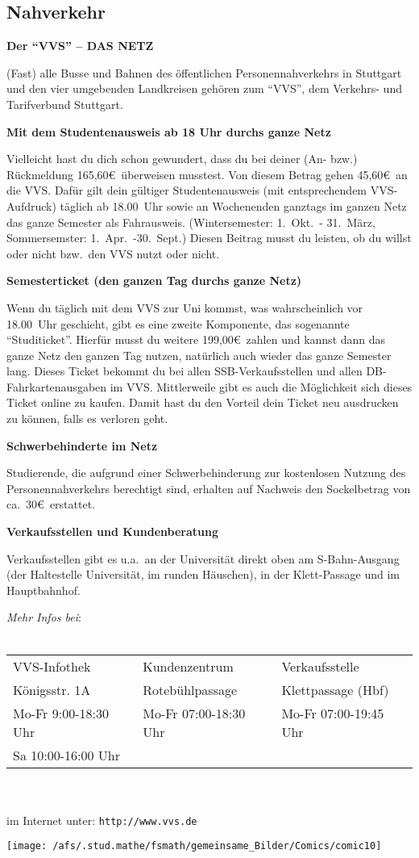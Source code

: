 \subsection{Nahverkehr}

{\large \bf Der "`VVS"' -- DAS NETZ}

(Fast) alle Busse und Bahnen des öffentlichen Personennahverkehrs
in Stuttgart und den vier umgebenden Landkreisen
gehören zum "`VVS"', dem Verkehrs- und Tarifverbund Stuttgart.

{\large \bf Mit dem Studentenausweis ab 18 Uhr durchs ganze Netz}

Vielleicht hast du dich schon gewundert,
dass du bei deiner (An- bzw.) Rückmeldung 165,60\euro\ überweisen musstest.
Von diesem Betrag gehen 45,60\euro\ an die VVS.
Dafür gilt dein gültiger Studentenausweis
(mit entsprechendem VVS-Aufdruck) täglich ab 18.00~Uhr
sowie an Wochenenden ganztags im ganzen Netz
das ganze Semester als Fahrausweis.
(Wintersemester: 1.~Okt.~- 31.~März, Sommersemster: 1.~Apr.~-30.~Sept.)
Diesen Beitrag musst du leisten,
ob du willst oder nicht bzw.~den VVS nutzt oder nicht.

{\large \bf Semesterticket (den ganzen Tag durchs ganze Netz)}

Wenn du täglich mit dem VVS zur Uni kommst,
was wahrscheinlich vor 18.00~Uhr geschieht,
gibt es eine zweite Komponente, das sogenannte "`Studiticket"'.
Hierfür musst du weitere 199,00\euro\ zahlen
und kannst dann das ganze Netz den ganzen Tag nutzen,
natürlich auch wieder das ganze Semester lang.
Dieses Ticket bekommt du bei allen SSB-Verkaufsstellen
und allen DB-Fahrkartenausgaben im VVS.
Mittlerweile gibt es auch die Möglichkeit sich dieses Ticket
online zu kaufen.
Damit hast du den Vorteil dein Ticket neu ausdrucken zu können,
falls es verloren geht.

{\large \bf Schwerbehinderte im Netz}

Studierende, die aufgrund einer Schwerbehinderung
zur kostenlosen Nutzung des Personennahverkehrs berechtigt sind,
erhalten auf Nachweis den Sockelbetrag von ca.\ 30\euro\ erstattet.

{\large \bf Verkaufsstellen und Kundenberatung}

Verkaufsstellen gibt es u.a.\ 
an der Universität direkt oben am S-Bahn-Ausgang
(der Haltestelle \glqq Universität\grqq, im runden Häuschen),
in der Klett-Passage und im Hauptbahnhof.

\newpage
{\it Mehr Infos bei}:\\
\\
\begin{tabular}{|l|l|l|}
\hline
VVS-Infothek & Kundenzentrum & Verkaufsstelle \\
Königsstr. 1A & Rotebühlpassage & Klettpassage (Hbf)  \\
Mo-Fr  9:00-18:30 Uhr & Mo-Fr 07:00-18:30 Uhr & Mo-Fr 07:00-19:45 Uhr \\
Sa 10:00-16:00 Uhr & & \\
\hline
\end{tabular}\\
\\
im Internet unter: \verb|http://www.vvs.de|


\vspace*{5cm}
\begin{center}
\texttt{[image: /afs/.stud.mathe/fsmath/gemeinsame\_Bilder/Comics/comic10]}
\end{center}


